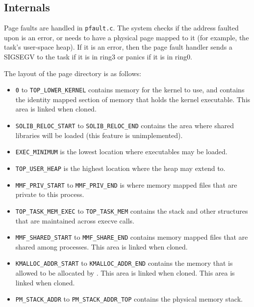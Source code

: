 \subsection{Internals}

Page faults are handled in \texttt{pfault.c}. The system checks if
the address faulted upon is an error, or needs to have a physical page
mapped to it (for example, the task's user-space heap). If it is an error, 
then the page fault handler sends a SIGSEGV to the task if it is in ring3
or panics if it is in ring0.

The layout of the page directory is as follows: 
\begin{itemize}
\item \texttt{0} to \texttt{TOP\_LOWER\_KERNEL}
contains memory for the kernel to use, and contains the identity mapped section
of memory that holds the kernel executable. This area is linked when cloned.

\item \texttt{SOLIB\_RELOC\_START} to \texttt{SOLIB\_RELOC\_END}
contains the area where shared libraries will be loaded (this feature
is unimplemented). 

\item \texttt{EXEC\_MINIMUM} is the lowest location where executables may
be loaded.

\item \texttt{TOP\_USER\_HEAP} is the highest location where the heap may extend to.

\item \texttt{MMF\_PRIV\_START} to \texttt{MMF\_PRIV\_END} is where memory mapped
files that are private to this process.

\item \texttt{TOP\_TASK\_MEM\_EXEC} to \texttt{TOP\_TASK\_MEM} contains the stack
and other structures that are maintained across execve calls.

\item \texttt{MMF\_SHARED\_START} to \texttt{MMF\_SHARE\_END} contains memory mapped
files that are shared among processes. This area is linked when cloned.

\item \texttt{KMALLOC\_ADDR\_START} to \texttt{KMALLOC\_ADDR\_END} contains the
memory that is allowed to be allocated by . This area is linked
when cloned. This area is linked when cloned.

\item \texttt{PM\_STACK\_ADDR} to \texttt{PM\_STACK\_ADDR\_TOP} contains the
physical memory stack.

\end{itemize}

